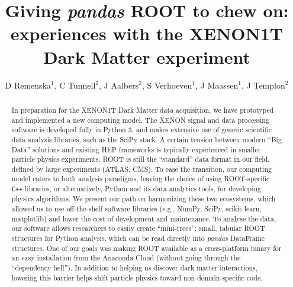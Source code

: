 \documentclass[a4paper]{jpconf}
\begin{document}
\def\code#1{\texttt{#1}}
\title{Giving \textit{pandas} ROOT to chew on: experiences with the XENON1T Dark Matter experiment}

\author{D Remenska$^{1}$, C Tunnell$^{2}$, J Aalbers$^{2}$, S Verhoeven$^{1}$, J Maassen$^{1}$, \newline J Templon$^{2}$}
\address{$^{1}$Netherlands eScience Center, Science Park 140, Amsterdam, The 
Netherlands}
\address{$^{2}$National Institute for Subatomic Physics (NIKHEF), Science 
Park 
105, Amsterdam, The Netherlands}

\begin{abstract}
In preparation for the XENON1T Dark Matter data acquisition, 
we have prototyped and implemented a new computing model. 
The XENON signal and data processing software is developed fully in Python 3, and makes extensive use of generic scientific data analysis libraries, such as the SciPy stack.
A certain tension between modern ``Big Data'' solutions and 
existing HEP frameworks is typically experienced in smaller particle physics experiments.
ROOT is still the ``standard'' data format in our field, defined by large experiments (ATLAS, CMS).
To ease the transition, our computing model caters to both analysis paradigms, leaving the choice of using ROOT-specific \texttt{C++} libraries, 
or alternatively, Python and its data analytics tools, for developing physics algorithms. 
We present our path on harmonizing these two ecosystems, which allowed us to use off-the-shelf software libraries
(e.g., NumPy, SciPy, scikit-learn, matplotlib) and lower the cost of development and maintenance. 
To analyse the data, our software allows researchers to easily create ``mini-trees'';
small, tabular ROOT structures for Python analysis, which can be read directly into \textit{pandas}
DataFrame structures. One of our goals was making ROOT available as a cross-platform binary for an easy
installation from the Anaconda Cloud (without going through the ``dependency hell'').
In addition to helping us discover dark matter interactions, lowering this barrier helps shift particle physics
toward non-domain-specific code.


\end{abstract}
\end{document}
